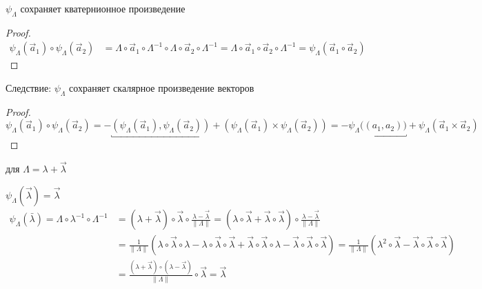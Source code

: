 \documentclass[crop=false]{standalone}
\begin{document}
\noindent \keypoint
$\psi_\Lambda$ сохраняет кватернионное произведение
\begin{proof}
\[
\begin{aligned}
\psi_\Lambda(\vec a_1) \circ \psi_\Lambda(\vec a_2) &= \Lambda \circ \vec a_1 \circ \Lambda^{-1} \circ \Lambda \circ \vec a_2 \circ \Lambda^{-1}  = \Lambda \circ \vec a_1 \circ \vec a_2 \circ \Lambda^{-1} = \psi_\Lambda(\vec a_1 \circ \vec a_2) 
\end{aligned}\]
\end{proof}
Следствие:
$\psi_\Lambda$ сохраняет скалярное произведение векторов
\begin{proof}
\[\psi_\Lambda(\vec a_1) \circ \psi_\Lambda(\vec a_2) = - \underbracket{(\psi_\Lambda(\vec a_1), \psi_\Lambda(\vec a_2))} + (\psi_\Lambda(\vec a_1) \times \psi_\Lambda(\vec a_2)) = - \underbracket{\psi_\Lambda\big((a_1, a_2)\big)} + \psi_\Lambda(\vec a_1 \times \vec a_2) \]
\end{proof}
\noindent \keypoint 
для $\Lambda = \lambda + \vec \lambda$

$\psi_\Lambda(\vec \lambda) = \vec \lambda$
\[
\begin{aligned}
\psi_\Lambda (\bar \lambda) = \Lambda \circ \lambda^{-1} \circ \Lambda^{-1}  &= (\lambda + \vec \lambda) \circ \vec \lambda \circ \frac{\lambda - \vec \lambda}{\| \Lambda \|} = (\lambda \circ \vec \lambda + \vec \lambda \circ \vec \lambda) \circ \frac{\lambda - \vec \lambda}{\| \Lambda \|} \\ 
&= \frac{1}{\| \Lambda \|} ( \lambda \circ \vec \lambda \circ \lambda - \lambda \circ \vec \lambda \circ \vec \lambda + \vec \lambda \circ \vec \lambda \circ \lambda - \vec \lambda \circ \vec \lambda \circ \vec \lambda) = \frac{1}{\| \Lambda \|} (\lambda^2 \circ \vec \lambda - \vec \lambda \circ \vec \lambda \circ \vec \lambda) \\
&= \frac{(\lambda + \vec \lambda) \circ (\lambda - \vec \lambda) }{\| \Lambda \|} \circ \vec \lambda = \vec \lambda
\end{aligned}
\]
\end{document}
